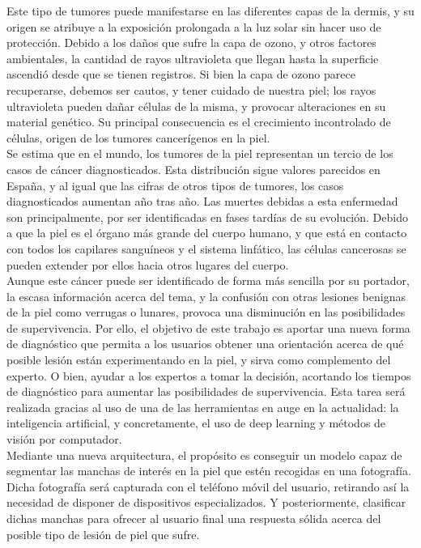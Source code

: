 Este tipo de tumores puede manifestarse en las diferentes capas de la dermis, y su origen se atribuye a la exposición prolongada a la luz solar sin hacer uso de protección. Debido a los daños que sufre la capa de ozono, y otros factores ambientales, la cantidad de rayos ultravioleta que llegan hasta la superficie ascendió desde que se tienen registros. Si bien la capa de ozono parece recuperarse, debemos ser cautos, y tener cuidado de nuestra piel; los rayos ultravioleta pueden dañar células de la misma, y provocar alteraciones en su material genético. Su principal consecuencia es el crecimiento incontrolado de células, origen de los tumores cancerígenos en la piel.\\

Se estima que en el mundo, los tumores de la piel representan un tercio de los casos de cáncer diagnosticados. Esta distribución sigue valores parecidos en España, y al igual que las cifras de otros tipos de tumores, los casos diagnosticados aumentan año tras año. Las muertes debidas a esta enfermedad son principalmente, por ser identificadas en fases tardías de su evolución. Debido a que la piel es el órgano más grande del cuerpo humano, y que está en contacto con todos los capilares sanguíneos y el sistema linfático, las células cancerosas se pueden extender por ellos hacia otros lugares del cuerpo.\\

Aunque este cáncer puede ser identificado de forma más sencilla por su portador, la escasa información acerca del tema, y la confusión con otras lesiones benignas de la piel como verrugas o lunares, provoca una disminución en las posibilidades de supervivencia. Por ello, el objetivo de este trabajo es aportar una nueva forma de diagnóstico que permita a los usuarios obtener una orientación acerca de qué posible lesión están experimentando en la piel, y sirva como complemento del experto. O bien, ayudar a los expertos a tomar la decisión, acortando los tiempos de diagnóstico para aumentar las posibilidades de supervivencia. Esta tarea será realizada gracias al uso de una de las herramientas en auge en la actualidad: la inteligencia artificial, y concretamente, el uso de deep learning y métodos de visión por computador.\\
 
 Mediante una nueva arquitectura, el propósito es conseguir un modelo capaz de segmentar las manchas de interés en la piel que estén recogidas en una fotografía. Dicha fotografía será capturada con el teléfono móvil del usuario, retirando así la necesidad de disponer de dispositivos especializados. Y posteriormente, clasificar dichas manchas para ofrecer al usuario final una respuesta sólida acerca del posible tipo de lesión de piel que sufre.\\

